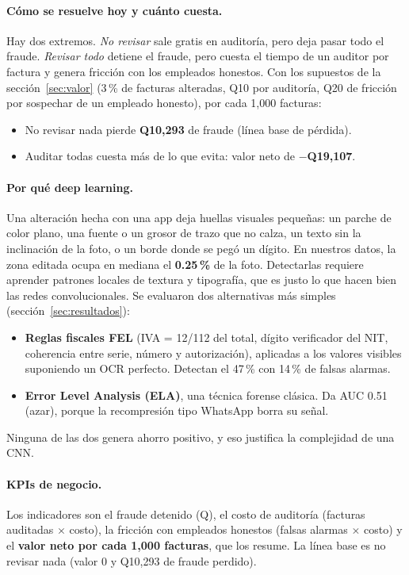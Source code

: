 \documentclass[11pt,letterpaper]{article}
\begin{document}
\paragraph{Cómo se resuelve hoy y cuánto cuesta.} Hay dos extremos. \emph{No revisar} sale gratis en auditoría, pero deja pasar todo el fraude. \emph{Revisar todo} detiene el fraude, pero cuesta el tiempo de un auditor por factura y genera fricción con los empleados honestos. Con los supuestos de la sección~\ref{sec:valor} (3\,\% de facturas alteradas, Q10 por auditoría, Q20 de fricción por sospechar de un empleado honesto), por cada 1,000 facturas:
\begin{itemize}
  \item No revisar nada pierde \textbf{Q10,293} de fraude (línea base de pérdida).
  \item Auditar todas cuesta más de lo que evita: valor neto de \textbf{$-$Q19,107}.
\end{itemize}

\paragraph{Por qué deep learning.} Una alteración hecha con una app deja huellas visuales pequeñas: un parche de color plano, una fuente o un grosor de trazo que no calza, un texto sin la inclinación de la foto, o un borde donde se pegó un dígito. En nuestros datos, la zona editada ocupa en mediana el \textbf{0.25\,\%} de la foto. Detectarlas requiere aprender patrones locales de textura y tipografía, que es justo lo que hacen bien las redes convolucionales. Se evaluaron dos alternativas más simples (sección~\ref{sec:resultados}):
\begin{itemize}
  \item \textbf{Reglas fiscales FEL} (IVA = 12/112 del total, dígito verificador del NIT, coherencia entre serie, número y autorización), aplicadas a los valores visibles suponiendo un OCR perfecto. Detectan el 47\,\% con 14\,\% de falsas alarmas.
  \item \textbf{Error Level Analysis (ELA)}, una técnica forense clásica. Da AUC 0.51 (azar), porque la recompresión tipo WhatsApp borra su señal.
\end{itemize}
Ninguna de las dos genera ahorro positivo, y eso justifica la complejidad de una CNN.

\paragraph{KPIs de negocio.} Los indicadores son el fraude detenido (Q), el costo de auditoría (facturas auditadas $\times$ costo), la fricción con empleados honestos (falsas alarmas $\times$ costo) y el \textbf{valor neto por cada 1,000 facturas}, que los resume. La línea base es no revisar nada (valor 0 y Q10,293 de fraude perdido).
\end{document}
